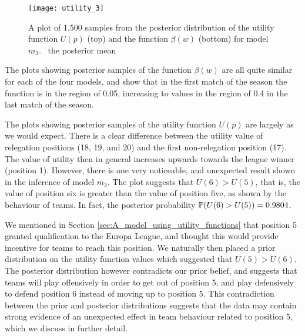 %
\begin{figure}[htp]
\begin{center}
  \texttt{[image: utility\_3]}
  \caption{\label{fig:utility_3} A plot of 1,500 samples from the posterior distribution of the utility function
  \(U(p)\) (top) and the function \(\beta(w)\) (bottom) for model \(m_3\). \protect\redSolidLine\ the posterior mean}
\end{center}
\end{figure}

The plots showing posterior samples of the function \(\beta(w)\) are all quite similar for each of the four models, and
show that in the first match of the season the function is in the region of 0.05, increasing to values in the region of
0.4 in the last match of the season.

The plots showing posterior samples of the utility function \(U(p)\) are largely as we would expect. There is a clear
difference between the utility value of relegation positions (18, 19, and 20) and the first non-relegation position
(17). The value of utility then in general increases upwards towards the league winner (position 1). However, there is
one very noticeable, and unexpected result shown in the inference of model \(m_3\). The plot suggests that \(U(6) >
U(5)\), that is, the value of position six is greater than the value of position five, as shown by the behaviour of
teams. In fact, the posterior probability \(\mathbb{P}(U(6) > U(5)) = 0.9804\).

We mentioned in Section \ref{sec:A_model_using_utility_functions} that position 5 granted qualification to the Europa
League, and thought this would provide incentive for teams to reach this position. We naturally then placed a prior
distribution on the utility function values which suggested that \(U(5) > U(6)\). The posterior distribution however
contradicts our prior belief, and suggests that teams will play offensively in order to get out of position 5, and play
defensively to defend position 6 instead of moving up to position 5. This contradiction between the prior and posterior
distributions suggests that the data may contain strong evidence of an unexpected effect in team behaviour related to
position 5, which we discuss in further detail.

